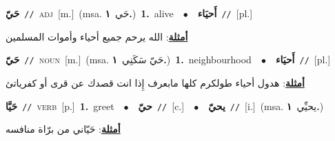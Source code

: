 \documentclass[10pt,a4paper,twoside]{article} %
\begin{document}
\begin{multicols}{2}
{\setlength\topsep{0pt}\textbf{\foreignlanguage{arabic}{حَيّ}}\ {\color{gray}\texttt{//}\color{black}}\ \textsc{adj}\ [m.]\ \color{gray}(msa. \foreignlanguage{arabic}{حَي}~\foreignlanguage{arabic}{\textbf{١.}})\color{black}\ \textbf{1.}~alive\ \ $\bullet$\ \ \setlength\topsep{0pt}\textbf{\foreignlanguage{arabic}{أَحيَاء}}\ {\color{gray}\texttt{//}\color{black}}\ [pl.]\  \begin{flushright}\color{gray}\foreignlanguage{arabic}{\textbf{\underline{\foreignlanguage{arabic}{أمثلة}}}: الله يرحم جميع أحياء وأموات المسلمين}\end{flushright}\color{black}} \vspace{2mm}

{\setlength\topsep{0pt}\textbf{\foreignlanguage{arabic}{حَيّ}}\ {\color{gray}\texttt{//}\color{black}}\ \textsc{noun}\ [m.]\ \color{gray}(msa. \foreignlanguage{arabic}{حَيّ سَكَنِي}~\foreignlanguage{arabic}{\textbf{١.}})\color{black}\ \textbf{1.}~neighbourhood\ \ $\bullet$\ \ \setlength\topsep{0pt}\textbf{\foreignlanguage{arabic}{أَحيَاء}}\ {\color{gray}\texttt{//}\color{black}}\ [pl.]\  \begin{flushright}\color{gray}\foreignlanguage{arabic}{\textbf{\underline{\foreignlanguage{arabic}{أمثلة}}}: هدول أحياء طولكرم كلها مابعرف إِذا انت قصدك عن قرى أو كفرياتئ}\end{flushright}\color{black}} \vspace{2mm}

{\setlength\topsep{0pt}\textbf{\foreignlanguage{arabic}{حَيَّا}}\ {\color{gray}\texttt{//}\color{black}}\ \textsc{verb}\ [p.]\ \textbf{1.}~greet\ \ $\bullet$\ \ \setlength\topsep{0pt}\textbf{\foreignlanguage{arabic}{حيّ}}\ {\color{gray}\texttt{//}\color{black}}\ [c.]\ \ $\bullet$\ \ \setlength\topsep{0pt}\textbf{\foreignlanguage{arabic}{يحيّ}}\ {\color{gray}\texttt{//}\color{black}}\ [i.]\ \color{gray}(msa. \foreignlanguage{arabic}{يحيِّي}~\foreignlanguage{arabic}{\textbf{١.}})\color{black}\  \begin{flushright}\color{gray}\foreignlanguage{arabic}{\textbf{\underline{\foreignlanguage{arabic}{أمثلة}}}: حَيّاني من برّاة منافسه}\end{flushright}\color{black}} \vspace{2mm}


\end{multicols}
\end{document}
